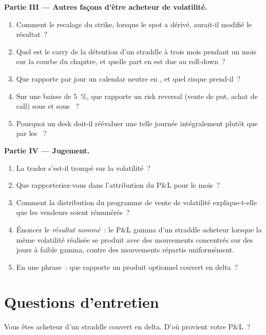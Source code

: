 \begin{problem}
\medskip\noindent\textbf{Partie III --- Autres façons d'être acheteur de volatilité.}
\begin{enumerate}[resume]
\item Comment le recalage du strike, lorsque le spot a dérivé, aurait-il modifié le résultat~?
\item Quel est le carry de la détention d'un straddle à trois mois pendant un mois sur la courbe du chapitre, et quelle part en est due au roll-down~?
\item Que rapporte par jour un calendar neutre en , et quel risque prend-il~?
\item Sur une baisse de 5~\%, que rapporte un risk reversal (vente de put, achat de call) sous  et sous ~?
\item Pourquoi un desk doit-il réévaluer une telle journée intégralement plutôt que par les ~?
\end{enumerate}

\medskip\noindent\textbf{Partie IV --- Jugement.}
\begin{enumerate}[resume]
\item La trader s'est-il trompé sur la volatilité~?
\item Que rapporteriez-vous dans l'attribution du P\&L pour le mois~?
\item Comment la distribution du programme de vente de volatilité explique-t-elle que les vendeurs soient rémunérés~?
\item Énoncer le \emph{résultat nommé}~: le P\&L gamma d'un straddle acheteur lorsque la même volatilité réalisée se produit avec des mouvements concentrés sur des jours à faible gamma,
contre des mouvements répartis uniformément.
\item En une phrase~: que rapporte un produit optionnel couvert en delta~?
\end{enumerate}
\end{problem}

\section{Questions d'entretien}

\begin{interviewq}\label{iq:dv:trading-volatility:1}
Vous êtes acheteur d'un straddle couvert en delta. D'où provient votre P\&L~?
\end{interviewq}

